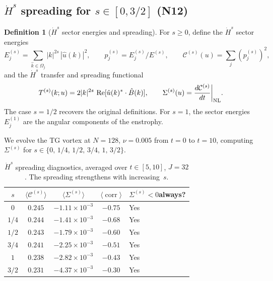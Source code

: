 \documentclass[11pt]{article}
\theoremstyle{definition}
\newtheorem{definition}[theorem]{Definition}
\newcommand{\Hdot}[1]{\dot{H}^{#1}}
\newcommand{\cC}{\mathcal{C}}
\DeclareMathOperator{\re}{Re}
\DeclareMathOperator{\corr}{corr}
\begin{document}
\subsection{$\Hdot{s}$ spreading for $s\in[0,3/2]$ (N12)}
\label{sec:Hs-spreading}

\begin{definition}[$\Hdot{s}$ sector energies and spreading]
\label{def:Hs-spreading}
For $s\geq 0$, define the $\Hdot{s}$ sector energies
\begin{equation}
E_j^{(s)} = \sum_{\hat k\in\Omega_j}
|k|^{2s}\,|\hat u(k)|^2,
\qquad p_j^{(s)} = E_j^{(s)}/E^{(s)},
\qquad \cC^{(s)}(u) = \sum_j (p_j^{(s)})^2,
\end{equation}
and the $\Hdot{s}$ transfer and spreading functional
\begin{equation}
T^{(s)}(k;u) = 2|k|^{2s}\,\re[\hat u(k)^*\cdot
\hat B(k)],
\qquad
\Sigma^{(s)}(u) = \frac{d\cC^{(s)}}{dt}
\bigg|_{\rm NL}.
\end{equation}
The case $s=1/2$ recovers the original definitions.
For $s=1$, the sector energies $E_j^{(1)}$ are the
angular components of the enstrophy.
\end{definition}

We evolve the TG vortex at $N=128$, $\nu=0.005$
from $t=0$ to $t=10$, computing $\Sigma^{(s)}$ for
$s\in\{0,\,1/4,\,1/2,\,3/4,\,1,\,3/2\}$.

\begin{table}[h]
\centering
\caption{$\Hdot{s}$ spreading diagnostics, averaged
over $t\in[5,10]$, $J=32$.  The spreading strengthens
with increasing~$s$.}
\label{tab:Hs}
\begin{tabular}{@{}ccccl@{}}
\toprule
$s$ & $\langle\cC^{(s)}\rangle$
  & $\langle\Sigma^{(s)}\rangle$
  & $\langle\corr\rangle$
  & $\Sigma^{(s)}<0$\;always? \\
\midrule
$0$   & $0.245$ & $-1.11\times 10^{-3}$ & $-0.75$ & Yes \\
$1/4$ & $0.244$ & $-1.41\times 10^{-3}$ & $-0.68$ & Yes \\
$1/2$ & $0.243$ & $-1.79\times 10^{-3}$ & $-0.60$ & Yes \\
$3/4$ & $0.241$ & $-2.25\times 10^{-3}$ & $-0.51$ & Yes \\
$1$   & $0.238$ & $-2.82\times 10^{-3}$ & $-0.43$ & Yes \\
$3/2$ & $0.231$ & $-4.37\times 10^{-3}$ & $-0.30$ & Yes \\
\bottomrule
\end{tabular}
\end{table}
\end{document}

